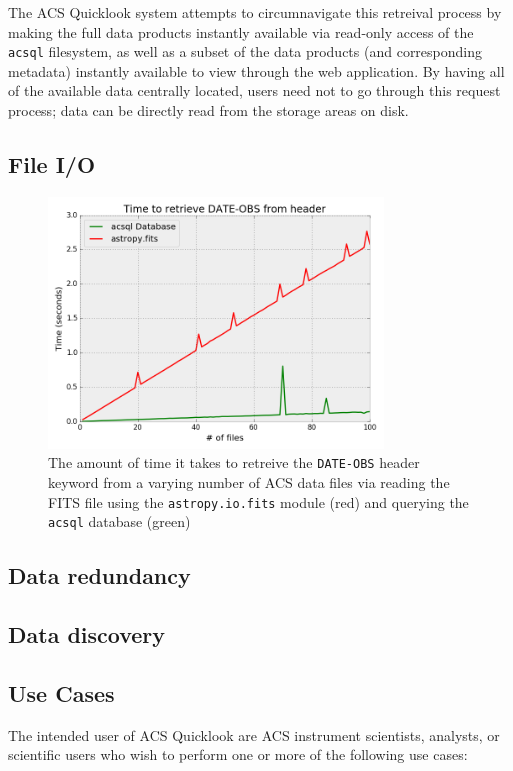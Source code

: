 \documentclass[10pt,journal,compsoc]{IEEEtran}
\begin{document}
The ACS Quicklook system attempts to circumnavigate this retreival process by making
the full data products instantly available via read-only access of the \texttt{acsql}
filesystem, as well as a subset of the data products (and corresponding metadata)
instantly available to view through the web application.  By having all of the available
data centrally located, users need not to go through this request process; data can
be directly read from the storage areas on disk.

\subsection{File I/O}

\begin{figure}[!t]
\centering
\includegraphics[width=3.5in]{./figures/fileio_time.png}
\caption{The amount of time it takes to retreive the \texttt{DATE-OBS} header keyword
from a varying number of ACS data files via reading the FITS file using the
\texttt{astropy.io.fits} module (red) and querying the \texttt{acsql} database (green)}
\label{fig1}
\end{figure}


\subsection{Data redundancy}


\subsection{Data discovery}


\subsection{Use Cases}
The intended user of ACS Quicklook are ACS instrument scientists, analysts,
or scientific users who wish to perform one or more of the following use cases:
\end{document}
